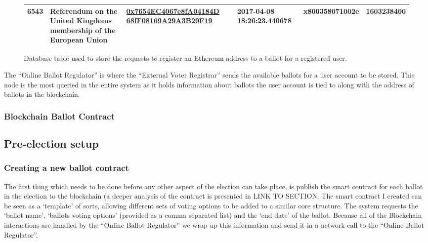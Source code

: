 \documentclass{article}
\begin{document}
\begin{figure}[h]
{\begin{tabular}{ | l | p{4cm} | p{4cm} | p{2.5cm} | p{2.5cm} | l |}
    		6543 & Referendum on the United Kingdoms membership of the European Union & \href{https://etherscan.io/address/0x7654EC4067e8fA04184D68fF08169A29A3B20F19}{0x7654EC4067e8fA04184D
    		68fF08169A29A3B20F19} & 2017-04-08 18:26:23.440678 & x800358071002e & 1603238400  \\ \hline 		
    		
    	\end{tabular}
  	}%
    
	\caption{Database table used to store the requests to register an Ethereum address to a ballot for a registered user.}
\end{figure}

The ``Online Ballot Regulator'' is where the ``External Voter Registrar'' sends the available ballots for a user account to be stored. This node is the most queried in the entire system as it holds information about ballots the user account is tied to along with the address of ballots in the blockchain.

\subsubsection{Blockchain Ballot Contract}

\cleardoublepage
\subsection{Pre-election setup}
\subsubsection{Creating a new ballot contract}
The first thing which needs to be done before any other aspect of the election can take place, is publish the smart contract for each ballot in the election to the blockchain (a deeper analysis of the contract is presented in {\Large LINK TO SECTION}. The smart contract I created can be seen as a `template' of sorts, allowing different sets of voting options to be added to a similar core structure. The system requests the `ballot name', `ballots voting options' (provided as a comma separated list) and the `end date' of the ballot. Because all of the Blockchain interactions are handled by the ``Online Ballot Regulator'' we wrap up this information and send it in a network call to the ``Online Ballot Regulator''.
\end{document}
